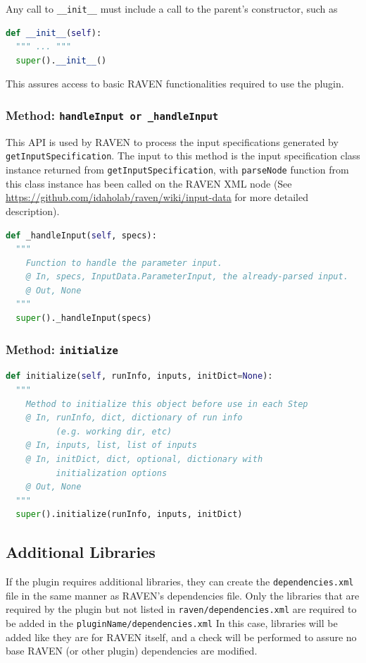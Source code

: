 Any call to \texttt{\_\_init\_\_} must include a call to the parent's constructor, such as
\begin{lstlisting}[language=python]
def __init__(self):
  """ ... """
  super().__init__()
\end{lstlisting}
This assures access to basic RAVEN functionalities required to use the plugin.

\subsubsection{Method: \texttt{handleInput or \_handleInput}}
\label{subsubsec:handleInput}
This API is used by RAVEN to process the input specifications generated by \texttt{getInputSpecification}.
The input to this method is the input specification class instance returned from
\texttt{getInputSpecification}, with \texttt{parseNode} function from this class instance has been called on the
RAVEN XML node (See \url{https://github.com/idaholab/raven/wiki/input-data} for more detailed description). 

\begin{lstlisting}[language=python]
def _handleInput(self, specs):
  """
    Function to handle the parameter input.
    @ In, specs, InputData.ParameterInput, the already-parsed input.
    @ Out, None
  """
  super()._handleInput(specs)
\end{lstlisting}



\subsubsection{Method: \texttt{initialize}}
\label{subsubsec:initialize}
\begin{lstlisting}[language=python]
def initialize(self, runInfo, inputs, initDict=None):
  """
    Method to initialize this object before use in each Step
    @ In, runInfo, dict, dictionary of run info
          (e.g. working dir, etc)
    @ In, inputs, list, list of inputs
    @ In, initDict, dict, optional, dictionary with
          initialization options
    @ Out, None
  """
  super().initialize(runInfo, inputs, initDict)
\end{lstlisting}



\subsection{Additional Libraries}
If the plugin requires additional libraries, they can create the \texttt{dependencies.xml} file in
the same manner as RAVEN's dependencies file. Only the libraries that are required by
the plugin but not listed in \texttt{raven/dependencies.xml} are required to be added in the \texttt{pluginName/dependencies.xml}
In this case, libraries will be added like they are for RAVEN
itself, and a check will be performed to assure no base RAVEN (or other plugin) dependencies are
modified.

